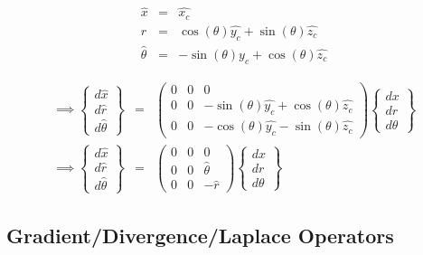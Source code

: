 \documentclass{kthreport}
\begin{document}
\begin{subequations}
	\begin{eqnarray}	
		\hat{x}	&= & \hat{x_{c}} \\
		\hat{r}   &= & \cos(\theta)\hat{y_{c}} + \sin(\theta)\hat{z_{c}}\\
		\hat{\theta}   &= & -\sin(\theta)\hat{y_{c}} + \cos(\theta)\hat{z_{c}}
		\label{eqn:unit_vector_mapping}
	\end{eqnarray}
\end{subequations}

\begin{eqnarray}
\implies
	\begin{Bmatrix}
		d\hat{x} \\
		d\hat{r}\\
		d\hat{\theta}
	\end{Bmatrix}
	&=& 
	\begin{pmatrix}
		0 &  0 &  0 \\
		0 & 0 &  -\sin(\theta)\hat{y_{c}} + \cos(\theta)\hat{z_{c}} \\
		0 & 0 & -\cos(\theta)\hat{y_{c}} - \sin(\theta)\hat{z_{c}}  
	\end{pmatrix}
	\begin{Bmatrix}
		dx \\
		dr \\
		d\theta
	\end{Bmatrix} \nonumber \\
%
\implies 	
\begin{Bmatrix}
	d\hat{x} \\
	d\hat{r}\\
	d\hat{\theta}
\end{Bmatrix}
& = &
\begin{pmatrix}
	0 &  0 &  0 \\
	0 & 0 &  \hat{\theta} \\
	0 & 0 & -\hat{r} 
\end{pmatrix}
\begin{Bmatrix}
	dx \\
	dr \\
	d\theta
\end{Bmatrix}
\label{eqn:Jacobian_unit_vector}
\end{eqnarray}

\subsection{Gradient/Divergence/Laplace Operators}
\end{document}
